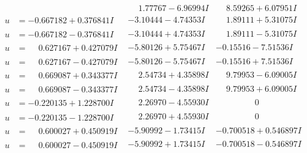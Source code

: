 \documentclass[1p]{elsarticle_modified}
\theoremstyle{definition}
\begin{document}
$$\begin{array}{c|c|c}
 & \phantom{-}1.77767 - 6.96994 I & \phantom{-}8.59265 + 6.07951 I \\ \hline\begin{aligned}
u &= -0.667182 + 0.376841 I\end{aligned}
 & -3.10444 - 4.74353 I & \phantom{-}1.89111 + 5.31075 I \\ \hline\begin{aligned}
u &= -0.667182 - 0.376841 I\end{aligned}
 & -3.10444 + 4.74353 I & \phantom{-}1.89111 - 5.31075 I \\ \hline\begin{aligned}
u &= \phantom{-}0.627167 + 0.427079 I\end{aligned}
 & -5.80126 + 5.75467 I & -0.15516 - 7.51536 I \\ \hline\begin{aligned}
u &= \phantom{-}0.627167 - 0.427079 I\end{aligned}
 & -5.80126 - 5.75467 I & -0.15516 + 7.51536 I \\ \hline\begin{aligned}
u &= \phantom{-}0.669087 + 0.343377 I\end{aligned}
 & \phantom{-}2.54734 + 4.35898 I & \phantom{-}9.79953 - 6.09005 I \\ \hline\begin{aligned}
u &= \phantom{-}0.669087 - 0.343377 I\end{aligned}
 & \phantom{-}2.54734 - 4.35898 I & \phantom{-}9.79953 + 6.09005 I \\ \hline\begin{aligned}
u &= -0.220135 + 1.228700 I\end{aligned}
 & \phantom{-}2.26970 - 4.55930 I & \phantom{-0.000000 } 0 \\ \hline\begin{aligned}
u &= -0.220135 - 1.228700 I\end{aligned}
 & \phantom{-}2.26970 + 4.55930 I & \phantom{-0.000000 } 0 \\ \hline\begin{aligned}
u &= \phantom{-}0.600027 + 0.450919 I\end{aligned}
 & -5.90992 - 1.73415 I & -0.700518 + 0.546897 I \\ \hline\begin{aligned}
u &= \phantom{-}0.600027 - 0.450919 I\end{aligned}
 & -5.90992 + 1.73415 I & -0.700518 - 0.546897 I \\ \hline\begin{aligned}

\end{aligned}
\end{array}$$
\end{document}
